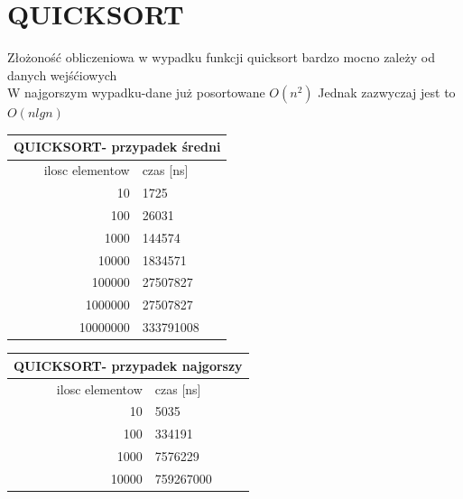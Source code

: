 \documentclass[a4paper,11pt]{report}
\begin{document}
\section{QUICKSORT}
Złożoność obliczeniowa w wypadku funkcji quicksort bardzo mocno zależy od danych wejśćiowych\\ 
W najgorszym wypadku-dane już posortowane $O(n^{2})$
Jednak zazwyczaj jest to $O(n lgn)$
  
\begin{tabular}{|rl|}
\hline
\multicolumn{2}{|c|}{QUICKSORT- przypadek średni}\\
\hline
ilosc elementow & czas [ns]\\
\hline
10&1725\\
100&26031\\
1000&144574\\
10000&1834571\\
100000&27507827\\
1000000&27507827\\
10000000&333791008\\
\hline
\end{tabular}
\newline
\newline
\begin{tabular}{|rl|}
\hline
\multicolumn{2}{|c|}{QUICKSORT- przypadek najgorszy}\\
\hline
ilosc elementow & czas [ns]\\
\hline
10&5035\\
100&334191\\
1000&7576229\\
10000&759267000\\
\hline
\end{tabular}
\\
\end{document}
